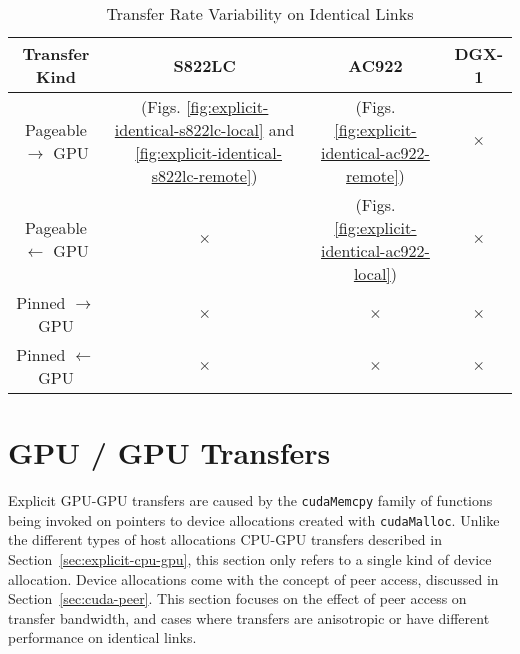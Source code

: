 \begin{table}[ht]
	\centering
	\caption[Transfer Rate Variability on Identical Links]{Transfer Rate Variability on Identical Links}
	\label{tab:explicit-identical}
	\begin{tabular}{cccc}
		\hline
		\textbf{Transfer Kind}     & \textbf{S822LC}                                                                                              & \textbf{AC922}                                               & \textbf{DGX-1} \\ \hline 
		Pageable $\rightarrow$ GPU & \checkmark (Figs. \ref{fig:explicit-identical-s822lc-local} and ~\ref{fig:explicit-identical-s822lc-remote}) & \checkmark (Figs. \ref{fig:explicit-identical-ac922-remote}) & $\times$       \\ \hline
		Pageable $\leftarrow$ GPU  & $\times$                                                                                                     & \checkmark (Figs. \ref{fig:explicit-identical-ac922-local})  & $\times$       \\ \hline
		Pinned $\rightarrow$ GPU   & $\times$                                                                                                     & $\times$                                                     & $\times$       \\ \hline
		Pinned $\leftarrow$ GPU    & $\times$                                                                                                     & $\times$                                                     & $\times$       \\ \hline
	\end{tabular}
\end{table}

\section{GPU / GPU Transfers}
\label{sec:explicit-gpu-gpu}

Explicit GPU-GPU transfers are caused by the \texttt{cudaMemcpy} family of functions being invoked on pointers to device allocations created with \texttt{cudaMalloc}.
Unlike the different types of host allocations CPU-GPU transfers described in Section~\ref{sec:explicit-cpu-gpu}, this section only refers to a single kind of device allocation.
Device allocations come with the concept of peer access, discussed in Section~\ref{sec:cuda-peer}.
This section focuses on the effect of peer access on transfer bandwidth, and cases where transfers are anisotropic or have different performance on identical links.

